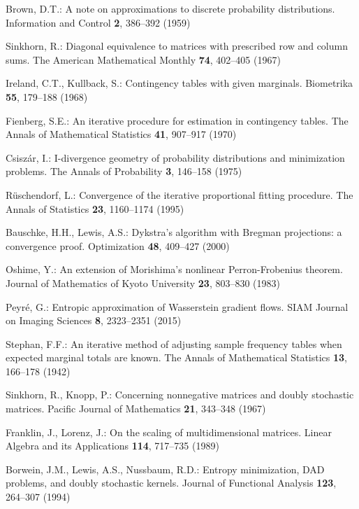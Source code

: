 \documentclass{article}
\theoremstyle{definition}
\begin{document}
\begin{thebibliography}{10}
Brown, D.T.: A note on approximations to discrete probability distributions.
\newblock Information and Control \textbf{2}, 386--392 (1959)

Sinkhorn, R.: Diagonal equivalence to matrices with prescribed row and column
  sums.
\newblock The American Mathematical Monthly \textbf{74}, 402--405 (1967)

Ireland, C.T., Kullback, S.: Contingency tables with given marginals.
\newblock Biometrika \textbf{55}, 179--188 (1968)

Fienberg, S.E.: An iterative procedure for estimation in contingency tables.
\newblock The Annals of Mathematical Statistics \textbf{41}, 907--917 (1970)

Csisz{\'a}r, I.: I-divergence geometry of probability distributions and
  minimization problems.
\newblock The Annals of Probability \textbf{3}, 146--158 (1975)

R\"{u}schendorf, L.: Convergence of the iterative proportional fitting
  procedure.
\newblock The Annals of Statistics \textbf{23}, 1160--1174 (1995)

Bauschke, H.H., Lewis, A.S.: Dykstra's algorithm with {Bregman} projections: a
  convergence proof.
\newblock Optimization \textbf{48}, 409--427 (2000)

Oshime, Y.: An extension of {M}orishima's nonlinear {P}erron-{F}robenius
  theorem.
\newblock Journal of Mathematics of Kyoto University \textbf{23}, 803--830
  (1983)

Peyr{\'e}, G.: Entropic approximation of {W}asserstein gradient flows.
\newblock SIAM Journal on Imaging Sciences \textbf{8}, 2323--2351 (2015)

Stephan, F.F.: An iterative method of adjusting sample frequency tables when
  expected marginal totals are known.
\newblock The Annals of Mathematical Statistics \textbf{13}, 166--178 (1942)

Sinkhorn, R., Knopp, P.: Concerning nonnegative matrices and doubly stochastic
  matrices.
\newblock Pacific Journal of Mathematics \textbf{21}, 343--348 (1967)

Franklin, J., Lorenz, J.: On the scaling of multidimensional matrices.
\newblock Linear Algebra and its Applications \textbf{114}, 717--735 (1989)

Borwein, J.M., Lewis, A.S., Nussbaum, R.D.: Entropy minimization, {DAD}
  problems, and doubly stochastic kernels.
\newblock Journal of Functional Analysis \textbf{123}, 264--307 (1994)


\end{thebibliography}
\end{document}
